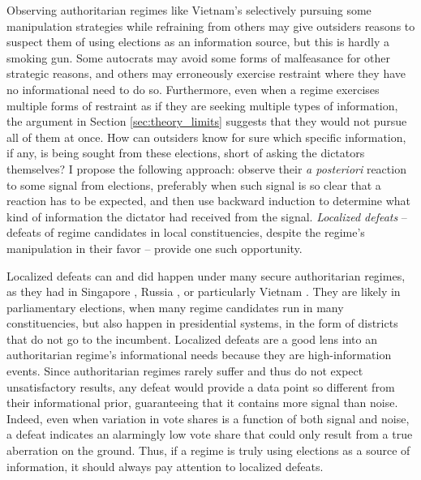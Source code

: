 \documentclass[12pt]{article}
\newcommand{\1}{\mathbbm{1}}
\begin{document}
Observing authoritarian regimes like Vietnam’s selectively pursuing some manipulation strategies while refraining from others may give outsiders reasons to suspect them of using elections as an information source, but this is hardly a smoking gun. Some autocrats may avoid some forms of malfeasance for other strategic reasons, and others may erroneously exercise restraint where they have no informational need to do so. Furthermore, even when a regime exercises multiple forms of restraint as if they are seeking multiple types of information, the argument in Section \ref{sec:theory_limits} suggests that they would not pursue all of them at once. How can outsiders know for sure which specific information, if any, is being sought from these elections, short of asking the dictators themselves?  I propose the following approach: observe their \textit{a posteriori} reaction to some signal from elections, preferably when such signal is so clear that a reaction has to be expected, and then use backward induction to determine what kind of information the dictator had received from the signal. \textit{Localized defeats} -- defeats of regime candidates in local constituencies, despite the regime's manipulation in their favor -- provide one such opportunity.


Localized defeats can and did happen under many secure authoritarian regimes, as they had in Singapore \citep{Ortmann2011, Miller2015}, Russia \citep{Gelman2013}, or particularly Vietnam \citep{MaleskySchuler2011}. They are likely in parliamentary elections, when many regime candidates run in many constituencies, but also happen in presidential systems, in the form of districts that do not go to the incumbent. Localized defeats are a good lens into an authoritarian regime's informational needs because they are high-information events. Since authoritarian regimes rarely suffer and thus do not expect unsatisfactory results, any defeat would provide a data point so different from their informational prior, guaranteeing that it contains more signal than noise. Indeed, even when variation in vote shares is a function of both signal and noise, a defeat indicates an alarmingly low vote share that could only result from a true aberration on the ground. Thus, if a regime is truly using elections as a source of information, it should always pay attention to localized defeats. 
\end{document}
